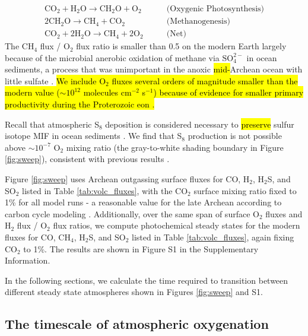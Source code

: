 \documentclass[9pt,twocolumn,twoside,lineno]{pnas-new}
\begin{document}
\begin{equation}
\begin{aligned}
    \mathrm{CO_2} + \mathrm{H_2O} \rightarrow \mathrm{CH_2O} + \mathrm{O_2} \quad\quad &\text{(Oxygenic Photosynthesis)} \\
    2 \mathrm{CH_2O} \rightarrow \mathrm{CH_4} + \mathrm{CO_2} \quad\quad &\text{(Methanogenesis)} \\
    \mathrm{CO_2} + 2\mathrm{H_2O} \rightarrow \mathrm{CH_4} + 2 \mathrm{O_2} \quad\quad &\text{(Net)}
\end{aligned}
\end{equation}
The CH$_4$ flux / O$_2$ flux ratio is smaller than 0.5 on the modern Earth largely because of the microbial anerobic oxidation of methane via $\mathrm{SO_4^{2-}}$ in ocean sediments, a process that was unimportant in the anoxic \hl{mid-}Archean ocean with little sulfate \cite{Canfield_2000,Catling_2007,Olson_2016}. \hl{We include O$_2$ fluxes several orders of magnitude smaller than the modern value ($\sim 10^{12}$ molecules cm$^{-2}$ s$^{-1}$) because of evidence for smaller primary productivity during the Proterozoic eon \mbox{\cite{Laakso_2019,Kipp_2021}}.}

Recall that atmospheric S$_8$ deposition is considered necessary to \hl{preserve} sulfur isotope MIF in ocean sediments \cite{Pavlov_2002}. We find that S$_8$ production is not possible above $\sim10^{-7}$ O$_2$ mixing ratio (the gray-to-white shading boundary in Figure \ref{fig:sweep}), consistent with previous results \cite{Zahnle_2006}.

Figure \ref{fig:sweep} uses Archean outgassing surface fluxes for CO, H$_2$, H$_2$S, and SO$_2$ listed in Table \ref{tab:volc_fluxes}, with the CO$_2$ surface mixing ratio fixed to 1\% for all model runs - a reasonable value for the late Archean according to carbon cycle modeling \cite{Krissansen-Totton_2018}. Additionally, over the same span of surface O$_2$ fluxes and H$_2$ flux / O$_2$ flux ratios, we compute photochemical steady states for the modern fluxes for CO, CH$_4$, H$_2$S, and SO$_2$ listed in Table \ref{tab:volc_fluxes}, again fixing CO$_2$ to 1\%. The results are shown in Figure S1 in the Supplementary Information.

In the following sections, we calculate the time required to transition between different steady state atmospheres shown in Figures \ref{fig:sweep} and S1.

\subsection*{The timescale of atmospheric oxygenation} \label{sec:oxygenation}
\end{document}
